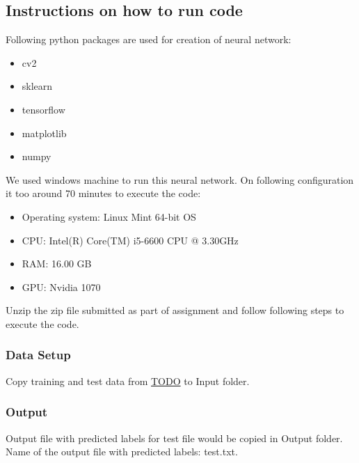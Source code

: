 \documentclass[fleqn,10pt]{SelfArx} %
\begin{document}
\subsection{Instructions on how to run code}
Following python packages are used for creation of neural network:
\begin{itemize}
\itemsep0em
  \item cv2
  \item sklearn
  \item tensorflow
  \item matplotlib
  \item numpy
\end{itemize}
We used windows machine to run this neural network. On following configuration it too around 70 minutes to execute the code:
\begin{itemize}
\itemsep0em
  \item Operating system: Linux Mint 64-bit OS
  \item CPU: Intel(R) Core(TM) i5-6600 CPU @ 3.30GHz
  \item RAM: 16.00 GB
  \item GPU: Nvidia 1070
\end{itemize}
Unzip the zip file submitted as part of assignment and follow following steps to execute the code.
\subsubsection{Data Setup}
Copy training and test data from \url{TODO} to Input folder.

\subsubsection{Output}
Output file with predicted labels for test file would be copied in Output folder. Name of the output file with predicted labels: test.txt.
\end{document}

